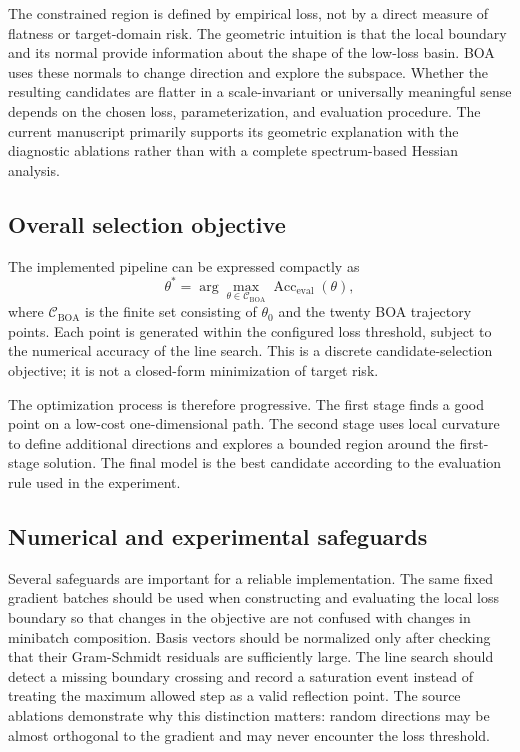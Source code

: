 \documentclass[11pt,a4paper]{article}
\begin{document}
The constrained region is defined by empirical loss, not by a direct measure of flatness or target-domain risk. The geometric intuition is that the local boundary and its normal provide information about the shape of the low-loss basin. BOA uses these normals to change direction and explore the subspace. Whether the resulting candidates are flatter in a scale-invariant or universally meaningful sense depends on the chosen loss, parameterization, and evaluation procedure. The current manuscript primarily supports its geometric explanation with the diagnostic ablations rather than with a complete spectrum-based Hessian analysis.

\subsection{Overall selection objective}
The implemented pipeline can be expressed compactly as
\begin{equation}
 \theta^*=\arg\max_{\theta\in\mathcal{C}_{\mathrm{BOA}}}
 \operatorname{Acc}_{\mathrm{eval}}(\theta),
 \label{eq:overall_objective}
\end{equation}
where $\mathcal{C}_{\mathrm{BOA}}$ is the finite set consisting of $\theta_0$ and the twenty BOA trajectory points. Each point is generated within the configured loss threshold, subject to the numerical accuracy of the line search. This is a discrete candidate-selection objective; it is not a closed-form minimization of target risk.

The optimization process is therefore progressive. The first stage finds a good point on a low-cost one-dimensional path. The second stage uses local curvature to define additional directions and explores a bounded region around the first-stage solution. The final model is the best candidate according to the evaluation rule used in the experiment.

\subsection{Numerical and experimental safeguards}
Several safeguards are important for a reliable implementation. The same fixed gradient batches should be used when constructing and evaluating the local loss boundary so that changes in the objective are not confused with changes in minibatch composition. Basis vectors should be normalized only after checking that their Gram-Schmidt residuals are sufficiently large. The line search should detect a missing boundary crossing and record a saturation event instead of treating the maximum allowed step as a valid reflection point. The source ablations demonstrate why this distinction matters: random directions may be almost orthogonal to the gradient and may never encounter the loss threshold.
\end{document}
